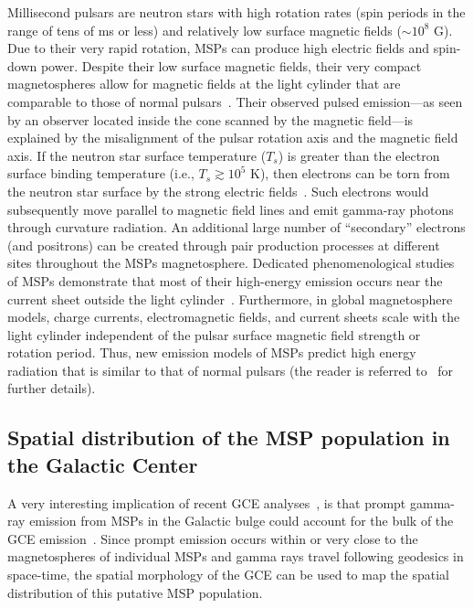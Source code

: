 \documentclass[doublespace,nopageskip]{VTthesis} %
\begin{document}
Millisecond pulsars are neutron stars with high rotation rates (spin periods in the range of tens of ms or less) and relatively low surface magnetic fields ($\sim 10^{8}$ G). Due to their very rapid rotation, MSPs can produce high  
electric fields and spin-down power. Despite their low surface magnetic fields, their very compact magnetospheres allow for 
magnetic fields at the light cylinder that are comparable to those of normal pulsars~\citep{2021arXiv210105751H}. Their observed pulsed emission---as seen by an observer located inside the cone scanned by the magnetic field---is explained by the misalignment of the pulsar rotation axis and the magnetic field axis.  If the neutron star surface temperature ($T_s$) is greater than the electron surface binding temperature (i.e., $T_s\gtrsim 10^5$ K), then electrons can be torn from the neutron star surface by the strong electric fields~\citep{1991tnsm.book.....M}. Such electrons would subsequently move parallel to magnetic field lines and emit gamma-ray photons through curvature radiation. An additional large number of ``secondary'' electrons (and positrons) can be created through pair production processes at different sites throughout the MSPs magnetosphere. 
Dedicated phenomenological studies of MSPs demonstrate that most of their high-energy emission occurs near the current sheet outside the light cylinder~\citep{2020ApJS..247...33A,2021arXiv210105751H}.
Furthermore, in global magnetosphere models, charge currents, electromagnetic fields, and current sheets scale with the light cylinder independent of the pulsar surface magnetic field strength or rotation period. Thus, new emission models of MSPs predict high energy radiation that is similar to that of normal pulsars (the reader is referred to~\citealt{2021arXiv210105751H} for further details).

\subsection{Spatial distribution of the MSP population in the Galactic Center}
\label{subsec:spatialdistribution}

A very interesting implication of recent GCE analyses~\citep{2018NatAs...2..387M,2018NatAs...2..819B,2019JCAP...09..042M,2020PhRvD.102d3012A}, is that prompt gamma-ray emission from MSPs in the Galactic bulge could account for the bulk of the GCE emission~\citep{2012PhRvD..86h3511A}. Since 
prompt emission occurs within or very close to the magnetospheres of individual MSPs and
gamma rays travel following geodesics in space-time, the spatial morphology of the GCE can be used to map the spatial distribution of this putative MSP population.
\end{document}
